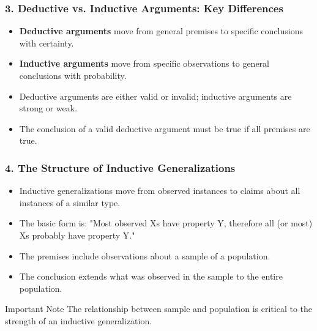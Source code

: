 \documentclass{beamer}
\begin{document}
\begin{frame}
\frametitle{3. Deductive vs. Inductive Arguments: Key Differences}
\begin{itemize}
\item \textbf{Deductive arguments} move from general premises to specific conclusions with certainty.
\item \textbf{Inductive arguments} move from specific observations to general conclusions with probability.
\item Deductive arguments are either valid or invalid; inductive arguments are strong or weak.
\item The conclusion of a valid deductive argument must be true if all premises are true.
\end{itemize}

\begin{center}
\end{center}
\end{frame}

\begin{frame}
\frametitle{4. The Structure of Inductive Generalizations}
\begin{itemize}
\item Inductive generalizations move from observed instances to claims about all instances of a similar type.
\item The basic form is: "Most observed Xs have property Y, therefore all (or most) Xs probably have property Y."
\item The premises include observations about a sample of a population.
\item The conclusion extends what was observed in the sample to the entire population.
\end{itemize}

\begin{alertblock}{Important Note}
The relationship between sample and population is critical to the strength of an inductive generalization.
\end{alertblock}
\end{frame}
\end{document}
